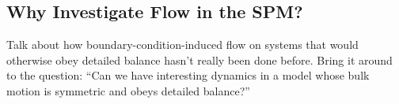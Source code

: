 \subsection{Why Investigate Flow in the SPM?}
Talk about how boundary-condition-induced flow on systems that would otherwise obey detailed balance hasn't really been done before.
Bring it around to the question:
``Can we have interesting dynamics in a model whose bulk motion is symmetric and obeys detailed balance?''

